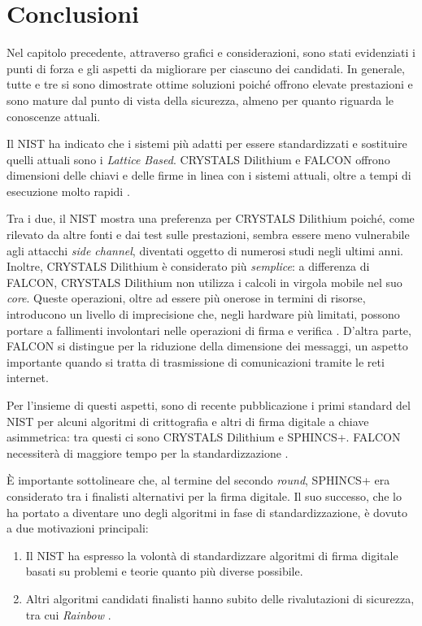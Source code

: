 \chapter{Conclusioni}

Nel capitolo precedente, attraverso grafici e considerazioni, sono stati evidenziati i punti di forza e gli aspetti da migliorare per ciascuno dei candidati. In generale, tutte e tre si sono dimostrate ottime soluzioni poiché offrono elevate prestazioni e sono mature dal punto di vista della sicurezza, almeno per quanto riguarda le conoscenze attuali.

Il NIST ha indicato che i sistemi più adatti per essere standardizzati e sostituire quelli attuali sono i \textit{Lattice Based}. CRYSTALS Dilithium e FALCON offrono dimensioni delle chiavi e delle firme in linea con i sistemi attuali, oltre a tempi di esecuzione molto rapidi \cite{NISTthirdReport}.

Tra i due, il NIST mostra una preferenza per CRYSTALS Dilithium poiché, come rilevato da altre fonti e dai test sulle prestazioni, sembra essere meno vulnerabile agli attacchi \textit{side channel}, diventati oggetto di numerosi studi negli ultimi anni. Inoltre, CRYSTALS Dilithium è considerato più \textit{semplice}: a differenza di FALCON, CRYSTALS Dilithium non utilizza i calcoli in virgola mobile nel suo \textit{core}. Queste operazioni, oltre ad essere più onerose in termini di risorse, introducono un livello di imprecisione che, negli hardware più limitati, possono portare a fallimenti involontari nelle operazioni di firma e verifica \cite{NISTthirdReport}. D'altra parte, FALCON si distingue per la riduzione della dimensione dei messaggi, un aspetto importante quando si tratta di trasmissione di comunicazioni tramite le reti internet.

Per l'insieme di questi aspetti, sono di recente pubblicazione i primi standard del NIST per alcuni algoritmi di crittografia e altri di firma digitale a chiave asimmetrica: tra questi ci sono CRYSTALS Dilithium e SPHINCS+. FALCON necessiterà di maggiore tempo per la standardizzazione \cite{nist2024article}.

È importante sottolineare che, al termine del secondo \textit{round}, SPHINCS+ era considerato tra i finalisti alternativi per la firma digitale. Il suo successo, che lo ha portato a diventare uno degli algoritmi in fase di standardizzazione, è dovuto a due motivazioni principali: 
\begin{enumerate}
    \item Il NIST ha espresso la volontà di standardizzare algoritmi di firma digitale basati su problemi e teorie quanto più diverse possibile.
    \item Altri algoritmi candidati finalisti hanno subito delle rivalutazioni di sicurezza, tra cui \textit{Rainbow} \cite{rainbow-website}.
\end{enumerate}

